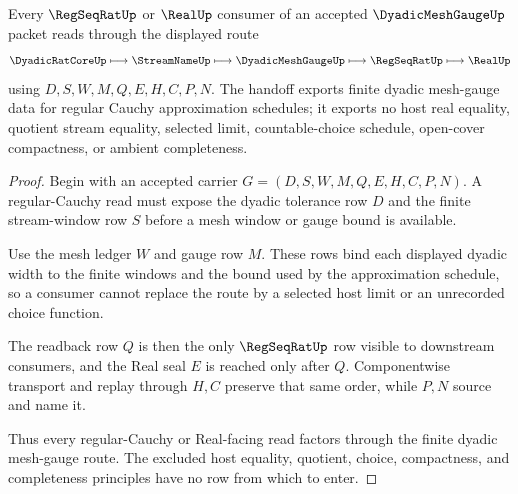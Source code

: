 \begin{theorem}
\label{thm:dyadic-mesh-gauge-regular-cauchy-handoff}
Every $\RegSeqRatUp$ or $\RealUp$ consumer of an accepted $\DyadicMeshGaugeUp$ packet reads through the displayed route
$$
\DyadicRatCoreUp \longmapsto \StreamNameUp \longmapsto \DyadicMeshGaugeUp \longmapsto \RegSeqRatUp \longmapsto \RealUp
$$
using $D,S,W,M,Q,E,H,C,P,N$. The handoff exports finite dyadic mesh-gauge data for regular Cauchy approximation schedules; it exports no host real equality, quotient stream equality, selected limit, countable-choice schedule, open-cover compactness, or ambient completeness.
\end{theorem}
\begin{proof}
Begin with an accepted carrier $G=(D,S,W,M,Q,E,H,C,P,N)$. A regular-Cauchy read must expose the dyadic tolerance row $D$ and the finite stream-window row $S$ before a mesh window or gauge bound is available.

Use the mesh ledger $W$ and gauge row $M$. These rows bind each displayed dyadic width to the finite windows and the bound used by the approximation schedule, so a consumer cannot replace the route by a selected host limit or an unrecorded choice function.

The readback row $Q$ is then the only $\RegSeqRatUp$ row visible to downstream consumers, and the Real seal $E$ is reached only after $Q$. Componentwise transport and replay through $H,C$ preserve that same order, while $P,N$ source and name it.

Thus every regular-Cauchy or Real-facing read factors through the finite dyadic mesh-gauge route. The excluded host equality, quotient, choice, compactness, and completeness principles have no row from which to enter.
\end{proof}



